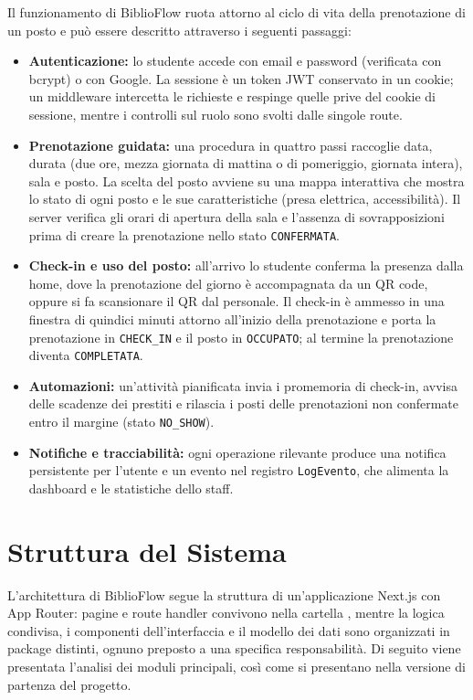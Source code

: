 \documentclass[11pt,a4paper,oneside,openany]{book}
\begin{document}
Il funzionamento di BiblioFlow ruota attorno al ciclo di vita della
prenotazione di un posto e può essere descritto attraverso i seguenti
passaggi:
\begin{itemize}
  \item \textbf{Autenticazione:} lo studente accede con email e password
        (verificata con bcrypt) o con Google. La sessione è un token JWT
        conservato in un cookie; un middleware intercetta le richieste e
        respinge quelle prive del cookie di sessione, mentre i controlli sul
        ruolo sono svolti dalle singole route.
  \item \textbf{Prenotazione guidata:} una procedura in quattro passi raccoglie
        data, durata (due ore, mezza giornata di mattina o di pomeriggio,
        giornata intera), sala e posto. La scelta del posto avviene su una
        mappa interattiva che mostra lo stato di ogni posto e le sue
        caratteristiche (presa elettrica, accessibilità). Il server verifica gli
        orari di apertura della sala e l'assenza di sovrapposizioni prima di
        creare la prenotazione nello stato \texttt{CONFERMATA}.
  \item \textbf{Check-in e uso del posto:} all'arrivo lo studente conferma la
        presenza dalla home, dove la prenotazione del giorno è accompagnata da
        un QR code, oppure si fa scansionare il QR dal personale. Il check-in è
        ammesso in una finestra di quindici minuti attorno all'inizio della
        prenotazione e porta la prenotazione in \texttt{CHECK\_IN} e il posto in
        \texttt{OCCUPATO}; al termine la prenotazione diventa
        \texttt{COMPLETATA}.
  \item \textbf{Automazioni:} un'attività pianificata invia i promemoria di
        check-in, avvisa delle scadenze dei prestiti e rilascia i posti delle
        prenotazioni non confermate entro il margine (stato \texttt{NO\_SHOW}).
  \item \textbf{Notifiche e tracciabilità:} ogni operazione rilevante produce
        una notifica persistente per l'utente e un evento nel registro
        \texttt{LogEvento}, che alimenta la dashboard e le statistiche dello
        staff.
\end{itemize}

\chapter{Struttura del Sistema}

L'architettura di BiblioFlow segue la struttura di un'applicazione Next.js con
App Router: pagine e route handler convivono nella cartella ,
mentre la logica condivisa, i componenti dell'interfaccia e il modello dei dati
sono organizzati in package distinti, ognuno preposto a una specifica
responsabilità. Di seguito viene presentata l'analisi dei moduli principali,
così come si presentano nella versione di partenza del progetto.
\end{document}
